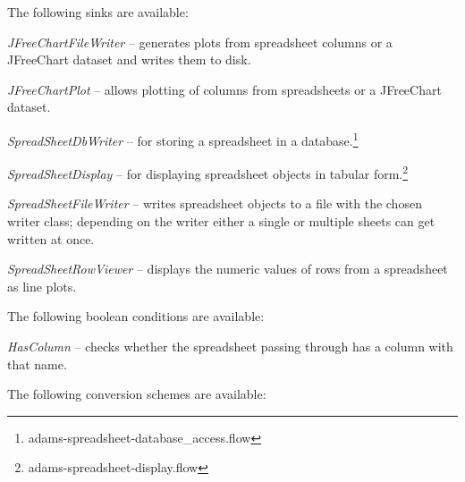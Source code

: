 \documentclass[a4paper]{book}
\begin{document}
The following sinks are available:
\begin{tight_itemize}
	\item \textit{JFreeChartFileWriter} -- generates plots from spreadsheet
	columns or a JFreeChart\cite{jfreechart} dataset and writes them to disk.
	\item \textit{JFreeChartPlot} -- allows plotting of columns from
	spreadsheets or a JFreeChart\cite{jfreechart} dataset.
	\item \textit{SpreadSheetDbWriter} -- for storing a spreadsheet in a
	database.\footnote{adams-spreadsheet-database\_access.flow}
	\item \textit{SpreadSheetDisplay} -- for displaying spreadsheet objects
	in tabular form.\footnote{adams-spreadsheet-display.flow}
	\item \textit{SpreadSheetFileWriter} -- writes spreadsheet objects to a file
	with the chosen writer class; depending on the writer either a single or
	multiple sheets can get written at once.
	\item \textit{SpreadSheetRowViewer} -- displays the numeric values of
	rows from a spreadsheet as line plots.
\end{tight_itemize}
The following boolean conditions are available:
\begin{tight_itemize}
	\item \textit{HasColumn} -- checks whether the spreadsheet passing through
	has a column with that name.
\end{tight_itemize}
The following conversion schemes are available:
\end{document}

